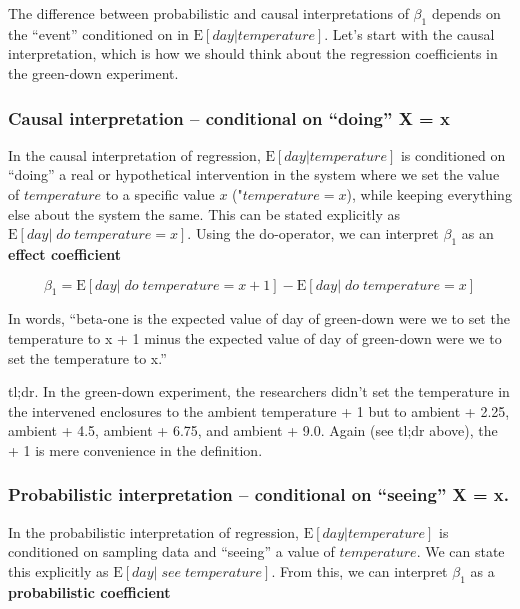 \documentclass[]{book}
\begin{document}
The difference between probabilistic and causal interpretations of \(\beta_1\) depends on the ``event'' conditioned on in \(\textrm{E}[day|temperature]\). Let's start with the causal interpretation, which is how we should think about the regression coefficients in the green-down experiment.

\hypertarget{causal-interpretation-conditional-on-doing-x-x}{%
\subsubsection{Causal interpretation -- conditional on ``doing'' X = x}\label{causal-interpretation-conditional-on-doing-x-x}}

In the causal interpretation of regression, \(\textrm{E}[day|temperature]\) is conditioned on ``doing'' a real or hypothetical intervention in the system where we set the value of \(temperature\) to a specific value \(x\) ("\(temperature=x\)), while keeping everything else about the system the same. This can be stated explicitly as \(\textrm{E}[day|\;do\;temperature = x]\). Using the do-operator, we can interpret \(\beta_1\) as an \textbf{effect coefficient}

\begin{equation}
\beta_1 = \textrm{E}[day|\;do\;temperature = x+1] - \textrm{E}[day|\;do\;temperature = x]
\end{equation}

In words, ``beta-one is the expected value of day of green-down were we to set the temperature to x + 1 minus the expected value of day of green-down were we to set the temperature to x.''

tl;dr. In the green-down experiment, the researchers didn't set the temperature in the intervened enclosures to the ambient temperature + 1 but to ambient + 2.25, ambient + 4.5, ambient + 6.75, and ambient + 9.0. Again (see tl;dr above), the + 1 is mere convenience in the definition.

\hypertarget{probabilistic-interpretation-conditional-on-seeing-x-x.}{%
\subsubsection{Probabilistic interpretation -- conditional on ``seeing'' X = x.}\label{probabilistic-interpretation-conditional-on-seeing-x-x.}}

In the probabilistic interpretation of regression, \(\textrm{E}[day|temperature]\) is conditioned on sampling data and ``seeing'' a value of \(temperature\). We can state this explicitly as \(\textrm{E}[day|\;see\;temperature]\). From this, we can interpret \(\beta_1\) as a \textbf{probabilistic coefficient}
\end{document}
